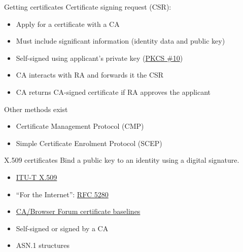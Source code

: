 \begin{frame}{Getting certificates}
  \pause
  Certificate signing request (CSR):
  \begin{itemize}[<+(1)->]
    \item Apply for a certificate with a CA
    \item Must include significant information (identity data and public key)
    \item Self-signed using applicant's private key (\href{https://datatracker.ietf.org/doc/html/rfc2986}{PKCS \#10})
    \item CA interacts with RA and forwards it the CSR
    \item CA returns CA-signed certificate if RA approves the applicant
  \end{itemize}

  \vspace*{1em}

  \pause
  Other methods exist
  \begin{itemize}[<+(1)->]
    \item Certificate Management Protocol (CMP)
    \item Simple Certificate Enrolment Protocol (SCEP)
  \end{itemize}
\end{frame}

\begin{frame}{X.509 certificates}
  \pause
  Bind a public key to an identity using a digital signature.
  \begin{itemize}[<+(1)->]
    \item \href{https://www.itu.int/rec/T-REC-X.509}{ITU-T X.509}
    \item \enquote{For the Internet}: \href{https://datatracker.ietf.org/doc/html/rfc5280}{RFC 5280}
    \item \href{https://cabforum.org}{CA/Browser Forum certificate baselines}
    \item Self-signed or signed by a CA
    \item ASN.1 structures
  \end{itemize}
\end{frame}

